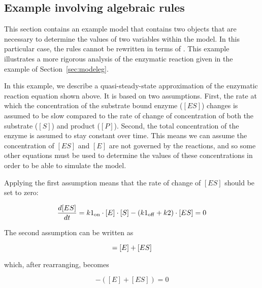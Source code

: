 \subsection{Example involving algebraic rules}
\label{sec:algeraiceg}

This section contains an example model that contains two
\AlgebraicRule objects that are necessary to determine the values
of two variables within the model.  In this particular case, the
rules cannot be rewritten in terms of \AssignmentRule.  This
example illustrates a more rigorous analysis of the enzymatic
reaction given in the example of Section~\ref{sec:modeleg}.
\begin{center}
\end{center}
In this example, we describe a quasi-steady-state approximation of
the enzymatic reaction equation shown above.  It is based on two
assumptions.  First, the rate at which the concentration of the
substrate bound enzyme ($[ES]$) changes is assumed to be slow
compared to the rate of change of concentration of both the
substrate ($[S]$) and product ($[P]$).  Second, the total
concentration of the enzyme is assumed to stay constant over time.
This means we can assume the concentration of $[ES]$ and $[E]$ are
not governed by the reactions, and so some other equations must be
used to determine the values of these concentrations in order to
be able to simulate the model.

Applying the first assumption means that the rate of change of
$[ES]$ should be set to zero:
\begin{linenomath}
\begin{equation*}
  \dfrac{d [ES]}{d t} = k1\sub{on} \cdot [E] \cdot [S] - (k1\sub{off} + k2) \cdot [ES] = 0
\end{equation*}
\end{linenomath}

The second assumption can be written as
\begin{linenomath}
\begin{equation*}
  [E\sub{total}] = [E] + [ES]\\[6pt]
\end{equation*}
\end{linenomath}
which, after rearranging, becomes
\begin{linenomath}
\begin{equation*}
  [E\sub{total}] - ([E] + [ES]) = 0
\end{equation*}
\end{linenomath}

